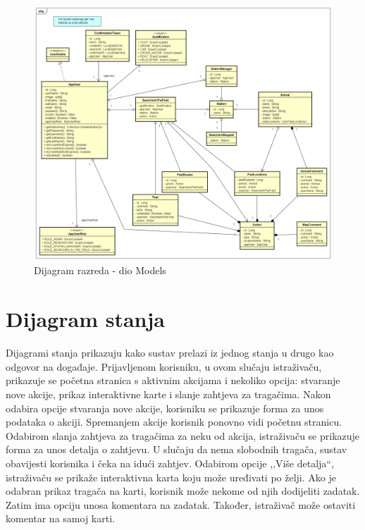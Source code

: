 			\begin{figure}[H]
				\includegraphics[scale=0.4]{dijagrami/Model.png} 
				\centering
				\caption{Dijagram razreda - dio Models}
				\label{fig:promjene}
			\end{figure}
			
			
			\eject
		
		\section{Dijagram stanja}
			
			
			Dijagrami stanja prikazuju kako sustav prelazi iz jednog stanja u drugo kao odgovor na događaje. Prijavljenom korisniku, u ovom slučaju istraživaču, prikazuje se početna stranica s aktivnim akcijama i nekoliko opcija: stvaranje nove akcije, prikaz interaktivne karte i slanje zahtjeva za tragačima. Nakon odabira opcije stvaranja nove akcije, korisniku se prikazuje forma za unos podataka o akciji. Spremanjem akcije korisnik ponovno vidi početnu stranicu. Odabirom slanja zahtjeva za tragačima za neku od akcija, istraživaču se prikazuje forma za unos detalja o zahtjevu. U slučaju da nema slobodnih tragača, sustav obavijesti korisnika i čeka na idući zahtjev. Odabirom opcije ,,Više detalja“, istraživaču se prikaže interaktivna karta koju može uređivati po želji. Ako je odabran prikaz tragača na karti, korisnik može nekome od njih dodijeliti zadatak. Zatim ima opciju unosa komentara na zadatak. Također, istraživač može ostaviti komentar na samoj karti.
			
